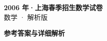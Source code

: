 \documentclass[zihao=-4, a4paper]{ctexart}
\begin{document}
\begin{center}
  {\Large\bfseries 2006 年·上海春季招生数学试卷}\\[4pt]
  {\large 数学 · 解析版}
\end{center}
\medskip
{}

\clearpage
{}
\begin{center}{\Large\bfseries 参考答案与详细解析}\end{center}
\medskip

\end{document}
